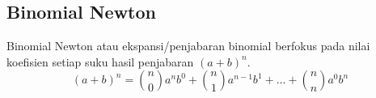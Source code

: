 \subsection{Binomial Newton}
Binomial Newton atau ekspansi/penjabaran binomial berfokus pada nilai koefisien setiap suku hasil penjabaran $(a+b)^n$.
$$(a+b)^n = {n \choose 0} a^nb^0 + {n \choose 1} a^{n-1}b^1+ \dots +{n \choose n}a^0b^n$$
